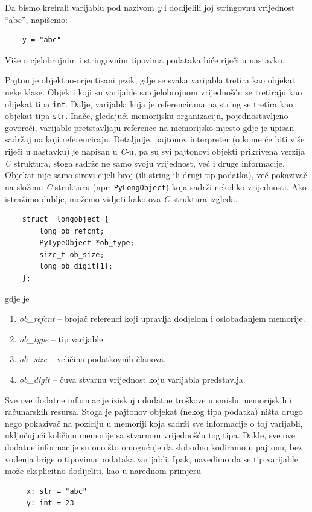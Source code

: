 Da bismo kreirali varijablu pod nazivom \textit{y} i dodijelili joj stringovnu vrijednost ``abc'', napišemo:
\begin{verbatim}
	y = "abc"
\end{verbatim}

Više o cjelobrojnim i stringovnim tipovima podataka biće riječi u nastavku. 
 
Pajton je objektno-orjentisani jezik, gdje se svaka varijabla tretira kao objekat neke klase.  
Objekti koji su varijable sa cjelobrojnom vrijednošću se tretiraju kao objekat tipa \texttt{int}. Dalje, varijabla koja je referencirana na string se tretira kao objekat tipa \texttt{str}.  Inače, gledajući memorijsku organizaciju, pojednostavljeno govoreći, varijable pretstavljaju reference na memorijsko mjesto gdje je upisan sadržaj na koji referenciraju.  
Detaljnije, pajtonov interpreter (o kome će biti više riječi u nastavku) je   napisan u \textit{C}-u, pa su svi pajtonovi objekti prikrivena verzija \textit{C} struktura, stoga  sadrže ne samo svoju vrijednost, već i druge informacije. Objekat nije samo sirovi cijeli broj (ili string ili drugi tip podatka), već pokazivač na složenu \textit{C} strukturu (npr. \texttt{PyLongObject}) koja sadrži nekoliko vrijednosti. Ako istražimo dublje, možemo vidjeti kako ova \textit{C} struktura izgleda.

\begin{verbatim}
	struct _longobject {
		long ob_refcnt;
		PyTypeObject *ob_type;
		size_t ob_size;
		long ob_digit[1];
	};
\end{verbatim}
gdje je
\begin{enumerate}
	\item   \textit{\textit{ob\_refcnt}} -- brojač referenci koji upravlja dodjelom i oslobađanjem memorije.
    \item \textit{ob\_type} -- tip varijable.
    \item  \textit{ob\_size} -- veličina podatkovnih članova.
    \item  \textit{ob\_digit} -- čuva stvarnu vrijednost koju varijabla predstavlja.
\end{enumerate}

Sve ove dodatne informacije iziskuju   dodatne troškove u smislu memorijskih i računarskih resursa. Stoga je pajtonov  objekat (nekog tipa podatka)  ništa drugo nego pokazivač na poziciju u memoriji koja sadrži sve informacije o toj varijabli, uključujući količinu memorije sa stvarnom vrijednošću   tog tipa.  Dakle, sve ove dodatne informacije su ono što omogućuje da slobodno kodiramo u pajtonu, bez vođenja brige o tipovima podataka varijabli. Ipak, navedimo da se tip varijable može eksplicitno dodijeliti, kao u narednom primjeru
\begin{verbatim}
	 x: str = "abc" 
	 y: int = 23
\end{verbatim}


